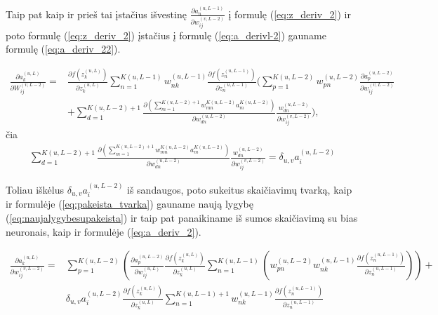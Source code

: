 Taip pat kaip ir prieš tai įstačius išvestinę $\frac{\partial a_n^{(u,L-1)}}{\partial w_{ij}^{(v,L-2)}}$ į formulę (\ref{eq:z_deriv_2}) ir poto formulę (\ref{eq:z_deriv_2}) įstačius į formulę (\ref{eq:a_derivl-2}) gauname formulę (\ref{eq:a_deriv_22}).


\begin{equation}\label{eq:a_deriv_22}
  \begin{aligned}
    \frac{\partial a_k^{(u, L)}}{\partial W_{ij}^{(v,L-2)}} =&
      \frac{\partial f(z_k^{(u, L)})}{\partial z_k^{(u,L)}} \sum_{n=1}^{K(u, L-1)} w_{nk}^{(u,L-1)}
      \frac{\partial f(z_n^{(u, L-1)})}{\partial z_n^{(u,L-1)}}
      (\sum_{p=1}^{K(u, L-2)} w_{pn}^{(u,L-2)}
      \frac{\partial a_p^{(u,L-2)}}{\partial w_{ij}^{(v,L-2)}} \\
    &+ \sum_{d=1}^{K(u,L-2)+1} \frac{\partial (\sum_{m=1}^{K(u,L-2)+1} w_{mn}^{K(u,L-2)} a_m^{K(u,L-2)})}{\partial w_{dn}^{(u,L-2)}}
      \frac{w_{dn}^{(u,L-2)}}{\partial w_{ij}^{(v,L-2)}}),
  \end{aligned}
\end{equation}
čia
\begin{equation*}
  \begin{aligned}
    \sum_{d=1}^{K(u,L-2)+1} \frac{\partial (\sum_{m=1}^{K(u,L-2)+1} w_{mn}^{K(u,L-2)} a_m^{K(u,L-2)})}{\partial w_{dn}^{(u,L-2)}} \frac{w_{dn}^{(u,L-2)}}{\partial w_{ij}^{(v,L-2)}}=\delta_{u,v}a_i^{(u,L-2)}
  \end{aligned}
\end{equation*}


Toliau iškėlus $\delta_{u,v}a_i^{(u,L-2)}$ iš sandaugos, poto sukeitus skaičiavimų tvarką, kaip ir formulėje (\ref{eq:pakeista_tvarka}) gauname naują lygybę (\ref{eq:naujalygybesupakeista}) ir taip pat panaikiname iš sumos skaičiavimą su bias neuronais, kaip ir formulėje (\ref{eq:a_deriv_2}).

\begin{equation}\label{eq:naujalygybesupakeista}
  \begin{aligned}
    \frac{\partial a_k^{(u, L)}}{\partial w_{ij}^{(v,L-2)}} = &
      \sum_{p=1}^{K(u,L-2)} ( \frac{ \partial a_p^{(u,L-2)} }{ \partial w_{ij}^{(u,L)} }\frac{ \partial f(z_k^{(u,L)}) }{ \partial z_k^{(u,L)} } \sum_{n=1}^{K(u,L-1)}( w_{pn}^{(u,L-2)}w_{nk}^{(u,L-1)}\frac{ \partial f(z_n^{(u,L-1)}) }{ \partial z_n^{(u,L-1)}}))+\\
       &\delta_{u,v}a_i^{(u,L-2)}\frac{\partial f(z_k^{(u,L)})}{\partial z_k^{(u,L)}}\sum_{n=1}^{K(u,L-1)+1} w_{nk}^{(u,L-1)} \frac{\partial f(z_n^{(u,L-1)})}{\partial z_n^{(u,L-1)}}
  \end{aligned}
\end{equation}


